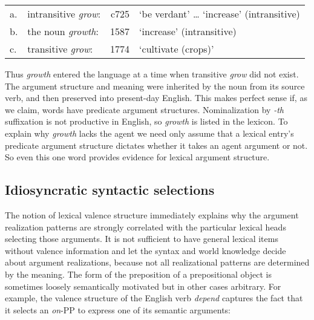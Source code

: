 \begin{exe}
\begin{xlist}[iv.]
\begin{exe}
\begin{xlist}[iv.]
\ea
\label{oed}
\begin{tabular}[t]{@{}l@{~}lrl@{}} 
a. & intransitive \emph{grow}: &  c725	& `be verdant' \ldots{} `increase' (intransitive)\\
b. & the noun \emph{growth}:   &  1587	& `increase' (intransitive)\\
c. & transitive \emph{grow}:   &  1774	& `cultivate (crops)'\\
\end{tabular}
\z

\noindent
Thus \emph{growth} entered the language at a time when transitive \emph{grow} did not exist. The argument structure and meaning were inherited by the noun from its source verb, and then preserved into present-day English.  This makes perfect sense if, as we claim, words have predicate argument structures.  Nominalization by \emph{-th} suffixation is not productive in English, so \emph{growth} is listed in the lexicon.  To explain why \emph{growth} lacks the agent we need only assume that a lexical entry's predicate argument structure dictates whether it takes an agent argument or not.   So even this one word provides evidence for lexical argument structure.  




\subsection{Idiosyncratic syntactic selections}
\label{sec-idiosyncratic-case-and-PP}


The notion of lexical valence structure immediately explains why the argument realization patterns
are strongly correlated with the particular lexical heads selecting those arguments.  
It is not sufficient to have general lexical items without valence information
and let the syntax and world knowledge decide about argument realizations, 
because not all 
realizational patterns are determined by the meaning. 
The form of the preposition of a prepositional object is sometimes loosely semantically motivated but in
other cases arbitrary.  For example, the valence structure of the English verb \emph{depend} captures the fact that it selects an \emph{on}-PP to express one of its semantic arguments: 


\end{xlist}
\end{exe}
\end{xlist}
\end{exe}
